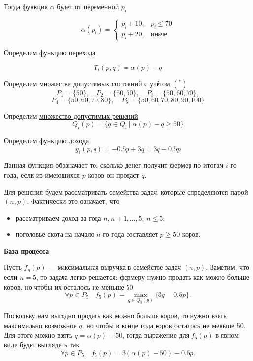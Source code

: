 Тогда функция $\alpha$ будет от переменной $p_i$

\[
\alpha(p_i) = \begin{cases}
	p_i + 10,& p_i \le 70 \\
	p_i + 20,& \text{иначе}
\end{cases}
\]

Определим \underline{функцию перехода}

\[T_i(p, q) = \alpha(p) - q\]

\bigskip


Определим \underline{множества допустимых состояний} с учётом $(^*)$
\[
P_1 = \{50\}, \quad P_2 = \{50, 60\}, \quad P_3 = \{50, 60, 70\},
\]
\[
P_4 = \{50, 60, 70, 80\}, \quad P_5 = \{50, 60, 70, 80, 90, 100\}
\]

\bigskip

Определим \underline{множество допустимых решений}
\[Q_i(p) = \{q \in Q_i \; \big| \; \alpha(p) - q \ge 50 \}\]

\bigskip

Определим \underline{функцию дохода}
\[g_i(p, q) = -0.5p + 3q = 3q - 0.5p\]

Данная функция обозначает то, сколько денег получит фермер по итогам $i$-го года, если из имеющихся $p$ коров он продаст $q$. 

\bigskip

Для решения будем рассматривать семейства задач, которые определяются парой $(n, p)$. Фактически это означает, что

\begin{itemize}[nosep]
	\item рассматриваем доход за года $n, n+1, \dots, 5$, $n \le 5$;
	
	\item поголовье скота на начало $n$-го года составляет $p \ge 50$ коров.
\end{itemize}

\bigskip

\textbf{База процесса}

Пусть $f_n(p)$ --- максимальная выручка в семействе задач $(n, p)$. Заметим, что если $n = 5$, то задача легко решается: фермеру нужно продать как можно больше коров, но чтобы их осталось не меньше 50
\[
\forall p \in P_5 \quad f_5(p) = \max_{q \in Q_5(p)} \{3q - 0.5p\}.
\]

Поскольку нам выгодно продать как можно больше коров, то нужно взять максимально возможное $q$, но чтобы в конце года коров осталось не меньше 50. Для этого можно взять $q = \alpha(p) - 50$, тогда выражение для $f_5(p)$ в явном виде будет выглядеть так
\[
\forall p \in P_5 \quad f_5(p) = 3(\alpha(p) - 50) - 0.5p.
\]

